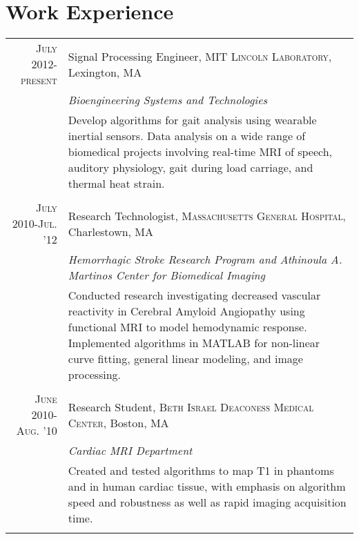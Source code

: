\documentclass[letterpaper,11pt]{article}
\begin{document}
\section{Work Experience}
\begin{tabular}{r|p{14.5cm}}
    \textsc{July 2012-present} & Signal Processing Engineer, \textsc{MIT Lincoln Laboratory}, Lexington, MA \\&\emph{Bioengineering Systems and Technologies}\\&\footnotesize{Develop algorithms for gait analysis using wearable inertial sensors. Data analysis on a wide range of biomedical projects involving real-time MRI of speech, auditory physiology, gait during load carriage, and thermal heat strain. }\\\multicolumn{2}{c}{} \vspace{-0.2cm}\\
\textsc{July 2010-Jul. '12} & Research Technologist, \textsc{Massachusetts General Hospital}, Charlestown, MA \\&\emph{Hemorrhagic Stroke Research Program and Athinoula A. Martinos Center for Biomedical Imaging}\\&\footnotesize{Conducted research investigating decreased vascular reactivity in Cerebral Amyloid Angiopathy using functional MRI to model hemodynamic response. Implemented algorithms in MATLAB for non-linear curve fitting, general linear modeling, and image processing.}\\\multicolumn{2}{c}{} \vspace{-0.2cm}\\
\textsc{June 2010-Aug. '10} & Research Student, \textsc{Beth Israel Deaconess Medical Center}, Boston, MA \\&\emph{Cardiac MRI Department}\\&\footnotesize{Created and tested algorithms to map T1 in phantoms and in human cardiac tissue, with emphasis on algorithm speed and robustness as well as rapid imaging acquisition time.}\\\multicolumn{2}{c}{} \vspace{-0.2cm} \\
\end{tabular}
\end{document}
